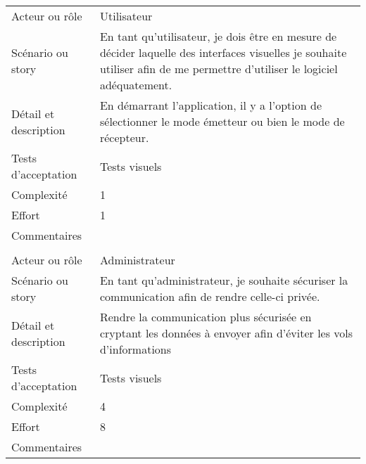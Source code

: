 \begin{longtable}{|l|p{}|}
\hline
    \rowcolor{Gray}
    \multicolumn{2}{|l|}{15} \\
\hline
    Acteur ou rôle & Utilisateur \\
\hline
    Scénario ou story &  En tant qu'utilisateur,
          je dois être en mesure de décider laquelle des interfaces visuelles je souhaite
          utiliser afin de me permettre d'utiliser le logiciel adéquatement.\\
\hline
    Détail et description & En démarrant l'application, il y a l'option de sélectionner le mode émetteur ou bien le mode de récepteur. \\
\hline
    Tests d'acceptation & Tests visuels\\
\hline
    Complexité & 1 \\
\hline
    Effort & 1\\
\hline
    Commentaires &  \\

\hline
    \rowcolor{Gray}
    \multicolumn{2}{|l|}{16} \\
\hline
    Acteur ou rôle & Administrateur \\
\hline
    Scénario ou story &  En tant qu'administrateur, je souhaite sécuriser la
          communication afin de rendre celle-ci privée.\\
\hline
    Détail et description & Rendre la communication plus sécurisée en cryptant les données à envoyer afin d'éviter les vols d'informations \\
\hline
    Tests d'acceptation & Tests visuels\\
\hline
    Complexité & 4 \\
\hline
    Effort & 8\\
\hline
    Commentaires &  \\
\hline
\end{longtable}



